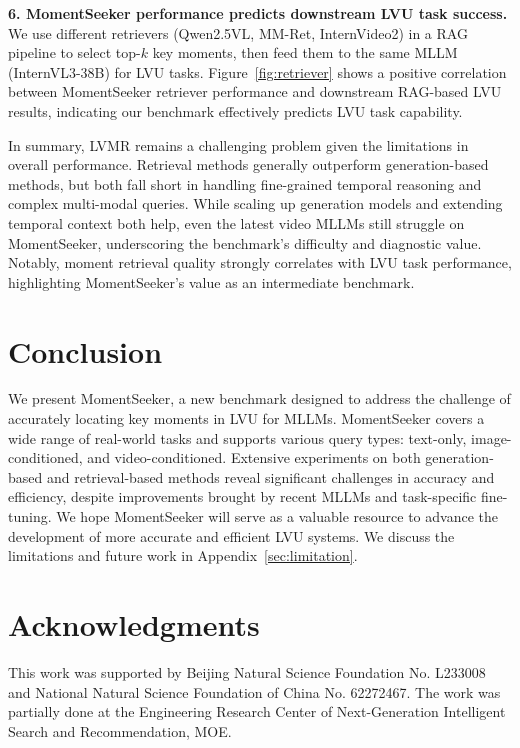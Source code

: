 \documentclass{article}
\begin{document}
\textbf{6. MomentSeeker performance predicts downstream LVU task success.}
We use different retrievers (Qwen2.5VL, MM-Ret, InternVideo2) in a RAG pipeline to select top-$k$ key moments, then feed them to the same MLLM (InternVL3-38B) for LVU tasks. Figure~\ref{fig:retriever} shows a positive correlation between MomentSeeker retriever performance and downstream RAG-based LVU results, indicating our benchmark effectively predicts LVU task capability.


In summary, LVMR remains a challenging problem given the limitations in overall performance. Retrieval methods generally outperform generation-based methods, but both fall short in handling fine-grained temporal reasoning and complex multi-modal queries. While scaling up generation models and extending temporal context both help, even the latest video MLLMs still struggle on MomentSeeker, underscoring the benchmark's difficulty and diagnostic value. Notably, moment retrieval quality strongly correlates with LVU task performance, highlighting MomentSeeker’s value as an intermediate benchmark.

\section{Conclusion}
We present MomentSeeker, a new benchmark designed to address the challenge of accurately locating key moments in LVU for MLLMs. MomentSeeker covers a wide range of real-world tasks and supports various query types: text-only, image-conditioned, and video-conditioned. Extensive experiments on both generation-based and retrieval-based methods reveal significant challenges in accuracy and efficiency, despite improvements brought by recent MLLMs and task-specific fine-tuning. We hope MomentSeeker will serve as a valuable resource to advance the development of more accurate and efficient LVU systems. We discuss the limitations and future work in Appendix~\ref{sec:limitation}.



\newpage


\section*{Acknowledgments}
This work was supported by Beijing Natural Science Foundation No. L233008 and National Natural Science Foundation of China No. 62272467. The work was partially done at the Engineering Research Center of Next-Generation Intelligent Search and Recommendation, MOE.
\end{document}
